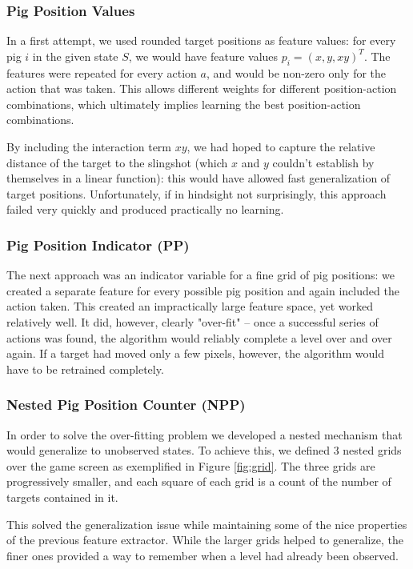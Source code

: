\documentclass[fleqn,10pt]{SelfArx} %
\begin{document}
\subsubsection{Pig Position Values}
In a first attempt, we used rounded target positions as feature values: for every pig $i$ in the given state $S$, we would have feature values $p_i=(x, y, xy)^T$. The features were repeated for every action $a$, and would be non-zero only for the action that was taken. This allows different weights for different position-action combinations, which ultimately implies learning the best position-action combinations.

By including the interaction term $xy$, we had hoped to capture the relative distance of the target to the slingshot (which $x$ and $y$ couldn't establish by themselves in a linear function): this would have allowed fast generalization of target positions. Unfortunately, if in hindsight not surprisingly, this approach failed very quickly and produced practically no learning.

\subsubsection{Pig Position Indicator (PP)}

The next approach was an indicator variable for a fine grid of pig positions: we created a separate feature for every possible pig position and again included the action taken. This created an impractically large feature space, yet worked relatively well. It did, however, clearly "over-fit" -- once a successful series of actions was found, the algorithm would reliably complete a level over and over again. If a target had moved only a few pixels, however, the algorithm would have to be retrained completely.

\subsubsection{Nested Pig Position Counter (NPP)}

In order to solve the over-fitting problem we developed a nested mechanism that would generalize to unobserved states. To achieve this, we defined 3 nested grids over the game screen as exemplified in Figure \ref{fig:grid}. The three grids are progressively smaller, and each square of each grid is a count of the number of targets contained in it. 

This solved the generalization issue while maintaining some of the nice properties of the previous feature extractor. While the larger grids helped to generalize, the finer ones provided a way to remember when a level had already been observed. 
\end{document}
